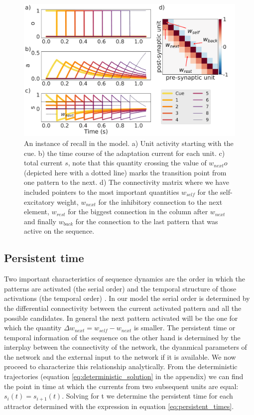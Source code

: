 \documentclass[10pt,a4paper]{article}
\begin{document}
\begin{figure}[H]
\centering
\includegraphics[scale=0.25]{simple_bcpnn_recall.pdf}
\caption{An instance of recall in the model. a) Unit activity starting with the cue. b) the time course of the adaptation current for each unit. c) total current $s$, note that this quantity crossing the value of $w_{next} o$ (depicted here with a dotted line) marks the transition point from one pattern to the next. d) The connectivity matrix where we have included pointers to the most important quantities $w_{self}$ for the self-excitatory weight, $w_{next}$ for the inhibitory connection to the next element, $w_{rest}$ for the biggest connection in the column after $w_{next}$ and finally $w_{back}$ for the connection to the last pattern that was active on the sequence.}
\label{fig:recall}
\end{figure}

\subsection{Persistent time}

Two important characteristics of sequence dynamics are the order in which the patterns are activated (the serial order) and the temporal structure of those activations (the temporal order) \cite{dominey2000neural}. 
In our model the serial order is determined by the differential connectivity between the current activated pattern and all the possible candidates. In general the next pattern activated will be the one for which the quantity $\Delta w_{next}  = w_{self} - w_{next}$ is smaller. The persistent time or temporal information of the sequence on the other hand is determined by the interplay between the connectivity of the network, the dyanmical parameters of the network and the external input to the network if it is available. We now proceed to characterize  this relationship analytically. From the deterministic trajectories (equation \ref{eq:deterministic_solution} in the appendix) we can find the point in time at which the currents from two subsequent units are equal: $s_i(t) = s_{i + 1}(t)$. Solving for t we determine the persistent time for each attractor determined with the expression in equation \ref{eq:persistent_times}.  
\end{document}
